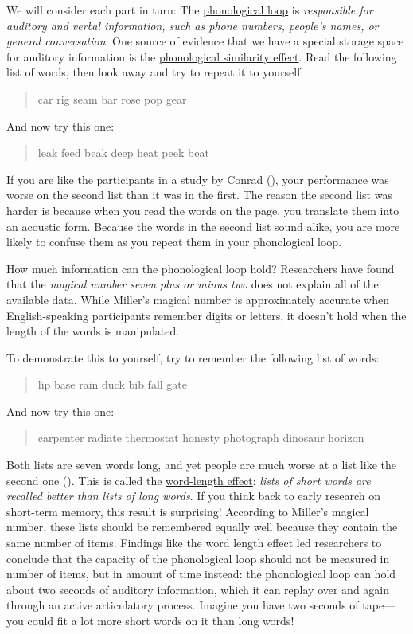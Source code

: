 \documentclass[
]{krantz}
\begin{document}
We will consider each part in turn: The \hyperref[phonological-loop]{phonological loop} is \emph{responsible for auditory and verbal information, such as phone numbers, people's names, or general conversation}. One source of evidence that we have a special storage space for auditory information is the \hyperref[phonological-similarity-effect]{phonological similarity effect}. Read the following list of words, then look away and try to repeat it to yourself:

\begin{quote}
car rig seam bar rose pop gear
\end{quote}

And now try this one:

\begin{quote}
leak feed beak deep heat peek beat
\end{quote}

If you are like the participants in a study by Conrad (), your performance was worse on the second list than it was in the first. The reason the second list was harder is because when you read the words on the page, you translate them into an acoustic form. Because the words in the second list sound alike, you are more likely to confuse them as you repeat them in your phonological loop.

How much information can the phonological loop hold? Researchers have found that the \emph{magical number seven plus or minus two} does not explain all of the available data. While Miller's magical number is approximately accurate when English-speaking participants remember digits or letters, it doesn't hold when the length of the words is manipulated.

To demonstrate this to yourself, try to remember the following list of words:

\begin{quote}
lip base rain duck bib fall gate
\end{quote}

And now try this one:

\begin{quote}
carpenter radiate thermostat honesty photograph dinosaur horizon
\end{quote}

Both lists are seven words long, and yet people are much worse at a list like the second one (). This is called the \hyperref[word-length-effect]{word-length effect}: \emph{lists of short words are recalled better than lists of long words}. If you think back to early research on short-term memory, this result is surprising! According to Miller's magical number, these lists should be remembered equally well because they contain the same number of items. Findings like the word length effect led researchers to conclude that the capacity of the phonological loop should not be measured in number of items, but in amount of time instead: the phonological loop can hold about two seconds of auditory information, which it can replay over and again through an active articulatory process. Imagine you have two seconds of tape--- you could fit a lot more short words on it than long words!
\end{document}
